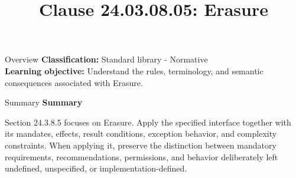 \documentclass[10pt,letterpaper]{article}
\title{Clause 24.03.08.05: Erasure}
\author{}
\date{}
\begin{document}
\maketitle
\begin{CornellOverviewBox}{Overview}
\textbf{Classification:} Standard library - Normative\\[2pt]
\textbf{Learning objective:} Understand the rules, terminology, and semantic consequences associated with Erasure.
\end{CornellOverviewBox}\begin{CornellSummaryBox}{Summary}
{\sffamily\bfseries\color{Accent} Summary}\par\vspace{3pt}Section 24.3.8.5 focuses on Erasure. Apply the specified interface together with its mandates, effects, result conditions, exception behavior, and complexity constraints. When applying it, preserve the distinction between mandatory requirements, recommendations, permissions, and behavior deliberately left undefined, unspecified, or implementation-defined.
\end{CornellSummaryBox}
\end{document}
